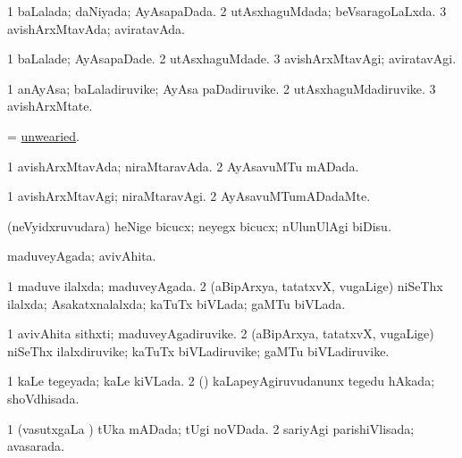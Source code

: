 \bentry
{} 
\gl{\gu}
\expl{}
\bmng
\bnum
\num{1} baLalada; daNiyada; AyAsapaDada. 
\num{2} utAsxhaguMdada; beVsaragoLaLxda. 
\num{3} avishArxMtavAda; aviratavAda. 
\enum
\emng
\eentry

\bentry
{} 
\gl{\kirxvi}
\expl{}
\bmng
\bnum
\num{1} baLalade; AyAsapaDade. 
\num{2} utAsxhaguMdade. 
\num{3} avishArxMtavAgi; aviratavAgi. 
\enum
\emng
\eentry

\bentry
{} 
\gl{\nA}
\expl{}
\bmng
\bnum
\num{1} anAyAsa; baLaladiruvike; AyAsa paDadiruvike. 
\num{2} utAsxhaguMdadiruvike. 
\num{3} avishArxMtate. 
\enum
\emng
\eentry

\bentry
{} 
\gl{\gu}
\expl{}
\bmng
= \hyperlink{unwearied}{unwearied}. 
\emng
\eentry

\bentry
{} 
\gl{\gu}
\expl{}
\bmng
\bnum
\num{1} avishArxMtavAda; niraMtaravAda. 
\num{2} AyAsavuMTu mADada. 
\enum
\emng
\eentry

\bentry
{} 
\gl{\kirxvi}
\expl{}
\bmng
\bnum
\num{1} avishArxMtavAgi; niraMtaravAgi. 
\num{2} AyAsavuMTumADadaMte. 
\enum
\emng
\eentry

\bentry
{} 
\gl{\sakirx}
\expl{}
\bmng
(neVyidxruvudara) heNige bicucx; neyegx bicucx; nUlunUlAgi biDisu. 
\emng
\eentry

\bentry
{} 
\gl{\gu}
\expl{}
\bmng
maduveyAgada; avivAhita. 
\emng
\eentry

\bentry
{} 
\gl{\gu}
\expl{}
\bmng
\bnum
\num{1} maduve ilalxda; maduveyAgada. 
\num{2} (aBipArxya, tatatxvX, \mo vugaLige) niSeThx ilalxda; Asakatxnalalxda; kaTuTx biVLada; gaMTu biVLada. 
\enum
\emng
\eentry

\bentry
{} 
\gl{\nA}
\expl{}
\bmng
\bnum
\num{1} avivAhita sithxti; maduveyAgadiruvike. 
\num{2} (aBipArxya, tatatxvX, \mo vugaLige) niSeThx ilalxdiruvike; kaTuTx biVLadiruvike; gaMTu biVLadiruvike. 
\enum
\emng
\eentry

\bentry
{} 
\gl{\gu}
\expl{}
\bmng
\bnum
\num{1} kaLe tegeyada; kaLe kiVLada. 
\num{2} (\rUpa) kaLapeyAgiruvudanunx tegedu hAkada; shoVdhisada. 
\enum
\emng
\eentry

\bentry
{} 
\gl{\gu}
\expl{}
\bmng
\bnum
\num{1} (vasutxgaLa \vi) tUka mADada; tUgi noVDada. 
\num{2} sariyAgi parishiVlisada; avasarada. 
\enum
\emng
\eentry

